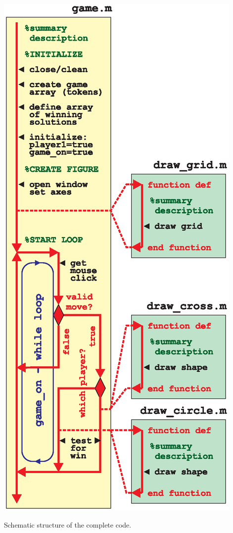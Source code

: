 \documentclass{tufte-book} %
\begin{document}
\begin{marginfigure}[0.0in]
\includegraphics[width=\linewidth]{ch6-gamex.eps}
\caption{Schematic structure of the complete code.}
\label{fig:ch6-gamex}
\end{marginfigure}
\end{document}
